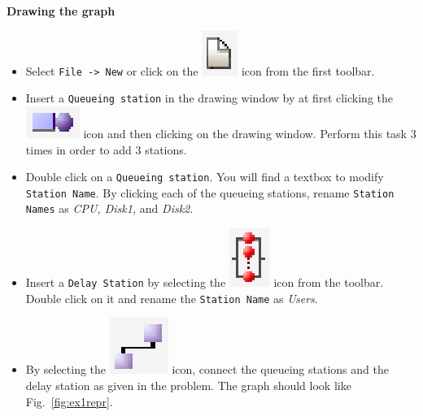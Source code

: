 \noindent \textbf{Drawing the graph}
\begin{itemize}
\item  Select \texttt{File -> New} or click on the
\includegraphics[scale=.5]{img/jsimg/new.eps} icon from
the first toolbar. \item Insert a \texttt{Queueing station} in the
drawing window by at first clicking the
\includegraphics[scale=.5]{img/jsimg/insertServer} icon and then clicking
on the drawing window. Perform this task 3 times in order to add 3
stations. \item Double click on a \texttt{Queueing station}. You
will find a textbox to modify \texttt{Station Name}. By clicking
each of the queueing stations, rename \texttt{Station Names} as
\emph{CPU, Disk1,} and \emph{Disk2}. \item Insert a \texttt{Delay
Station} by selecting the
\includegraphics[scale=.5]{img/jsimg/insertDelay} icon from
the toolbar. Double click on it and rename the \texttt{Station
Name} as \emph{Users}. \item By selecting the
\includegraphics[scale=.5]{img/jsimg/connect} icon, connect
the queueing stations and the delay station as given in the
problem. The graph should look like Fig.~\ref{fig:ex1repr}.
\end{itemize}
